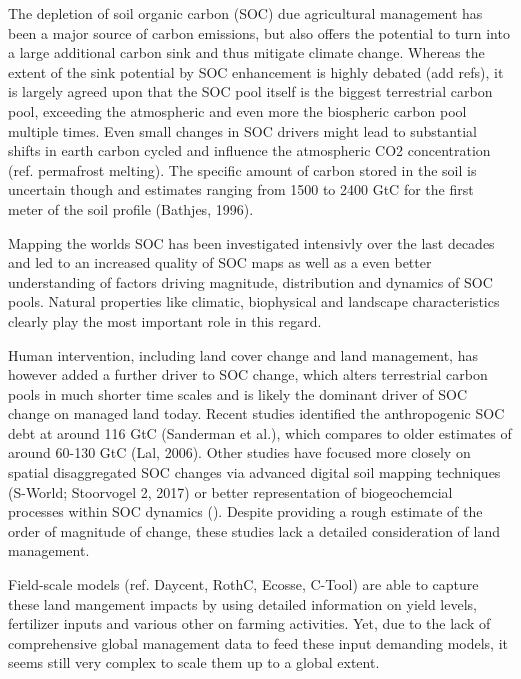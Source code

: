 \documentclass[gc, manuscript]{copernicus}
\begin{document}


\newpage

\introduction

The depletion of soil organic carbon (SOC) due agricultural management
has been a major source of carbon emissions, but also offers the
potential to turn into a large additional carbon sink and thus mitigate
climate change. Whereas the extent of the sink potential by SOC
enhancement is highly debated (add refs), it is largely agreed upon that
the SOC pool itself is the biggest terrestrial carbon pool, exceeding
the atmospheric and even more the biospheric carbon pool multiple times.
Even small changes in SOC drivers might lead to substantial shifts in
earth carbon cycled and influence the atmospheric CO2 concentration
(ref. permafrost melting). The specific amount of carbon stored in the
soil is uncertain though and estimates ranging from 1500 to 2400 GtC for
the first meter of the soil profile (Bathjes, 1996).

Mapping the worlds SOC has been investigated intensivly over the last
decades and led to an increased quality of SOC maps as well as a even
better understanding of factors driving magnitude, distribution and
dynamics of SOC pools. Natural properties like climatic, biophysical and
landscape characteristics clearly play the most important role in this
regard.

Human intervention, including land cover change and land management, has
however added a further driver to SOC change, which alters terrestrial
carbon pools in much shorter time scales and is likely the dominant
driver of SOC change on managed land today. Recent studies identified
the anthropogenic SOC debt at around 116 GtC (Sanderman et al.), which
compares to older estimates of around 60-130 GtC (Lal, 2006). Other
studies have focused more closely on spatial disaggregated SOC changes
via advanced digital soil mapping techniques (S-World; Stoorvogel 2,
2017) or better representation of biogeochemcial processes within SOC
dynamics (). Despite providing a rough estimate of the order of
magnitude of change, these studies lack a detailed consideration of land
management.

Field-scale models (ref. Daycent, RothC, Ecosse, C-Tool) are able to
capture these land mangement impacts by using detailed information on
yield levels, fertilizer inputs and various other on farming activities.
Yet, due to the lack of comprehensive global management data to feed
these input demanding models, it seems still very complex to scale them
up to a global extent.
\end{document}
